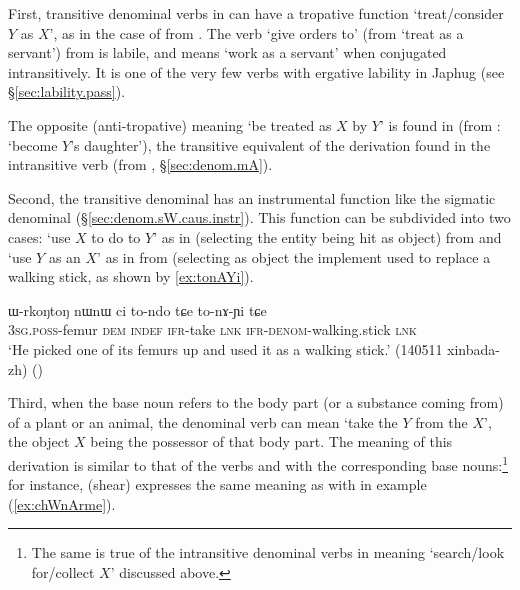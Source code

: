 First, transitive denominal verbs in  can have a tropative function `treat/consider $Y$ as $X$', as in the case of  from . The verb  `give orders to' (from `treat as a servant') from  is labile, and means `work as a servant' when conjugated intransitively. It is one of the very few verbs with ergative lability in Japhug (see §\ref{sec:lability.pass}).


The opposite (anti-tropative) meaning `be treated as $X$ by $Y$' is found in   (from : `become $Y$'s daughter'), the transitive equivalent of the  derivation found in the intransitive verb  (from  , §\ref{sec:denom.mA}). 



Second, the transitive  denominal has an instrumental function like the sigmatic denominal (§\ref{sec:denom.sW.caus.instr}). This function can be subdivided into two cases: `use $X$ to do to $Y$' as in   (selecting the entity being hit as object) from  and `use $Y$ as an $X$' as in   from  (selecting as object the implement used to replace a walking stick, as shown by \ref{ex:tonAYi}).

\begin{exe}
\ex \label{ex:tonAYi}
\gll  ɯ-rkoŋtoŋ nɯnɯ ci to-ndo tɕe to-nɤ-ɲi tɕe \\
\textsc{3sg}.\textsc{poss}-femur \textsc{dem} \textsc{indef} \textsc{ifr}-take \textsc{lnk} \textsc{ifr}-\textsc{denom}-walking.stick \textsc{lnk} \\
\glt `He picked one of its femurs up and used it as a walking stick.' (140511 xinbada-zh) 
()
\end{exe}

Third, when the base noun refers to the body part (or a substance coming from) of a plant or an animal, the denominal verb can mean `take the $Y$ from the $X$', the object $X$ being the possessor of that body part. The meaning of this derivation is similar to that of the verbs  and  with the corresponding base nouns:\footnote{The same is true of the intransitive denominal verbs in  meaning `search/look for/collect $X$' discussed above.}  for instance,  (shear) expresses the same meaning as  with  in example  (\ref{ex:chWnArme}).

